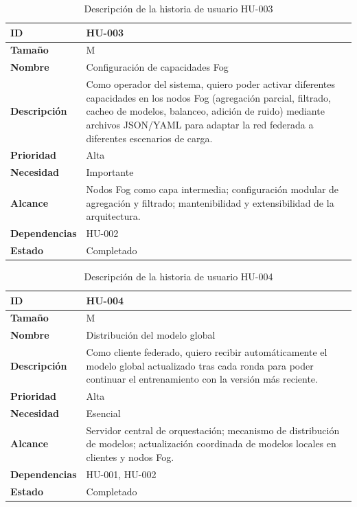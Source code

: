 \documentclass{report}
\begin{document}
\begin{table}[H]
\centering
\caption{Descripción de la historia de usuario HU-003}
\label{tab:hu003}
\begin{tabular}{|l|p{12cm}|}
\hline
\textbf{ID} & HU-003 \\ \hline
\textbf{Tamaño} & M \\ \hline
\textbf{Nombre} & Configuración de capacidades Fog \\ \hline
\textbf{Descripción} & 
Como operador del sistema, quiero poder activar diferentes capacidades en los nodos Fog (agregación parcial, filtrado, cacheo de modelos, balanceo, adición de ruido) mediante archivos JSON/YAML para adaptar la red federada a diferentes escenarios de carga. \\ \hline
\textbf{Prioridad} & Alta \\ \hline
\textbf{Necesidad} & Importante \\ \hline
\textbf{Alcance} & Nodos Fog como capa intermedia; configuración modular de agregación y filtrado; mantenibilidad y extensibilidad de la arquitectura. \\ \hline
\textbf{Dependencias} & HU-002 \\ \hline
\textbf{Estado} & Completado \\ \hline
\end{tabular}
\end{table}



\begin{table}[H]
\centering
\caption{Descripción de la historia de usuario HU-004}
\label{tab:hu004}
\begin{tabular}{|l|p{12cm}|}
\hline
\textbf{ID} & HU-004 \\ \hline
\textbf{Tamaño} & M \\ \hline
\textbf{Nombre} & Distribución del modelo global \\ \hline
\textbf{Descripción} & 
Como cliente federado, quiero recibir automáticamente el modelo global actualizado tras cada ronda para poder continuar el entrenamiento con la versión más reciente. \\ \hline
\textbf{Prioridad} & Alta \\ \hline
\textbf{Necesidad} & Esencial \\ \hline
\textbf{Alcance} & Servidor central de orquestación; mecanismo de distribución de modelos; actualización coordinada de modelos locales en clientes y nodos Fog. \\ \hline
\textbf{Dependencias} & HU-001, HU-002 \\ \hline
\textbf{Estado} & Completado \\ \hline
\end{tabular}
\end{table}
\end{document}

